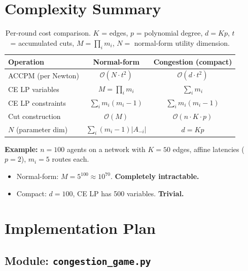 \documentclass[11pt]{article}
\newcommand{\bigO}{\mathcal{O}}
\begin{document}
\section{Complexity Summary}

\begin{table}[h]
\centering
\begin{tabular}{lcc}
\toprule
\textbf{Operation} & \textbf{Normal-form} & \textbf{Congestion (compact)} \\
\midrule
ACCPM (per Newton) & $\bigO(N \cdot t^2)$ & $\bigO(d \cdot t^2)$ \\
CE LP variables & $M = \prod_i m_i$ & $\sum_i m_i$ \\
CE LP constraints & $\sum_i m_i(m_i-1)$ & $\sum_i m_i(m_i-1)$ \\
Cut construction & $\bigO(M)$ & $\bigO(n \cdot K \cdot p)$ \\
\midrule
$N$ (parameter dim) & $\sum_i(m_i{-}1)|A_{-i}|$ & $d = Kp$ \\
\bottomrule
\end{tabular}
\caption{Per-round cost comparison. $K$ = edges, $p$ = polynomial degree, $d = Kp$, $t$ = accumulated cuts, $M = \prod_i m_i$, $N = $ normal-form utility dimension.}
\end{table}

\textbf{Example:} $n = 100$ agents on a network with $K = 50$ edges, affine latencies ($p=2$), $m_i = 5$ routes each.
\begin{itemize}[nosep]
    \item Normal-form: $M = 5^{100} \approx 10^{70}$. \textbf{Completely intractable.}
    \item Compact: $d = 100$, CE LP has 500 variables. \textbf{Trivial.}
\end{itemize}

\section{Implementation Plan}

\subsection{Module: \texttt{congestion\_game.py}}
\end{document}
